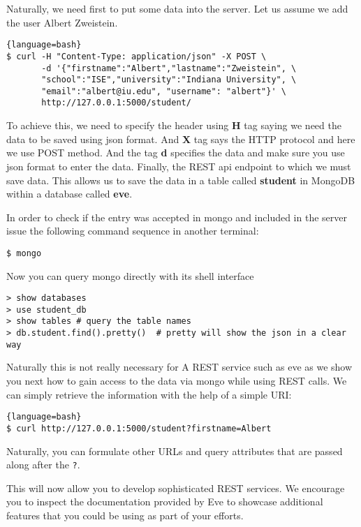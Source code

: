 Naturally, we need first to put some data into the server. Let us assume
we add the user Albert Zweistein.

\begin{lstlisting}{language=bash}
$ curl -H "Content-Type: application/json" -X POST \
       -d '{"firstname":"Albert","lastname":"Zweistein", \
       "school":"ISE","university":"Indiana University", \
       "email":"albert@iu.edu", "username": "albert"}' \
       http://127.0.0.1:5000/student/
\end{lstlisting}

To achieve this, we need to specify the header using \textbf{H} tag
saying we need the data to be saved using json format. And \textbf{X}
tag says the HTTP protocol and here we use POST method. And the tag
\textbf{d} specifies the data and make sure you use json format to
enter the data. Finally, the REST api endpoint to which we must save
data. This allows us to save the data in a table called
\textbf{student} in MongoDB within a database called \textbf{eve}.

In order to check if the entry was accepted in mongo and included in the
server issue the following command sequence in another terminal:

\begin{lstlisting}
$ mongo
\end{lstlisting}

Now you can query mongo directly with its shell interface

\begin{lstlisting}
> show databases
> use student_db  
> show tables # query the table names
> db.student.find().pretty()  # pretty will show the json in a clear way
\end{lstlisting}

Naturally this is not really necessary for A REST service such as eve
as we show you next how to gain access to the data via mongo while
using REST calls. We can simply retrieve
the information with the help of a simple URI:


\begin{lstlisting}{language=bash}
$ curl http://127.0.0.1:5000/student?firstname=Albert
\end{lstlisting}

Naturally, you can formulate other URLs and query attributes that are
passed along after the \verb|?|. 

This will now allow you to develop sophisticated REST services. We
encourage you to inspect the documentation provided by Eve to showcase
additional features that you could be using as part of your efforts.

